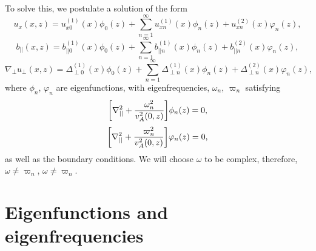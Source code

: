 \documentclass{article}
\begin{document}
To solve this, we postulate a solution of the form
\[u_x(x,z) = u_{x0}^{(1)}(x)\phi_0(z) + \sum_{n=1}^\infty u_{xn}^{(1)}(x)\phi_n(z) + u_{xn}^{(2)}(x)\varphi_n(z),\]
\[b_{||}(x,z) = b_{||0}^{(1)}(x)\phi_0(z) + \sum_{n=1}^\infty b_{||n}^{(1)}(x)\phi_n(z) + b_{||n}^{(2)}(x)\varphi_n(z),\]
\[\nabla_\perp u_\perp(x,z) = \Delta_{\perp0}^{(1)}(x)\phi_0(z) + \sum_{n=1}^\infty \Delta_{\perp n}^{(1)}(x)\phi_n(z) + \Delta_{\perp n}^{(2)}(x)\varphi_n(z),\]
where $\phi_n$, $\varphi_n$ are eigenfunctions, with eigenfrequencies, $\omega_n$, $\varpi_n$ satisfying 
\[\qty[\nabla_{||}^2+\frac{\omega_n^2}{v_A^2(0,z)}]\phi_n(z)=0,\]
\[\qty[\nabla_{||}^2+\frac{{\varpi}_n^2}{v_A^2(0,z)}]\varphi_n(z)=0,\]
as well as the boundary conditions. We will choose $\omega$ to be complex, therefore, $\omega\ne\varpi_n$, $\omega\ne\varpi_n$.

\section*{Eigenfunctions and eigenfrequencies}
\end{document}
